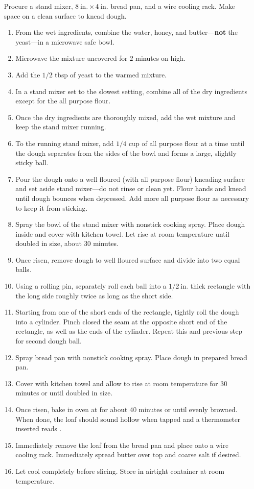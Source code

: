 \documentclass{article}
\begin{document}
\instructions
Procure a stand mixer, $8~\mathrm{in.}\times4~\mathrm{in.}$ bread pan, and a wire cooling rack. Make space on a clean surface to knead dough.
\begin{enumerate}
    \item From the wet ingredients, combine the water, honey, and butter---\textbf{not} the yeast---in a microwave safe bowl.
    \item Microwave the mixture uncovered for $2$ minutes on high.\footnotemark[5]
    \item Add the $1/2$ tbsp of yeast to the warmed mixture.
    \item In a stand mixer set to the slowest setting, combine all of the dry ingredients except for the all purpose flour.
    \item Once the dry ingredients are thoroughly mixed, add the wet mixture and keep the stand mixer running.
    \item To the running stand mixer, add $1/4$ cup of all purpose flour at a time until the dough separates from the sides of the bowl and forms a large, slightly sticky ball.
    \item Pour the dough onto a well floured (with all purpose flour) kneading surface and set aside stand mixer---do not rinse or clean yet. Flour hands and knead until dough bounces when depressed. Add more all purpose flour as necessary to keep it from sticking.
    \item Spray the bowl of the stand mixer with nonstick cooking spray. Place dough inside and cover with kitchen towel. Let rise at room temperature until doubled in size, about $30$ minutes.
    \item Once risen, remove dough to well floured surface and divide into two equal balls.
    \item Using a rolling pin, separately roll each ball into a $1/2~\mathrm{in.}$ thick rectangle with the long side roughly twice as long as the short side.
    \item Starting from one of the short ends of the rectangle, tightly roll the dough into a cylinder. Pinch closed the seam at the opposite short end of the rectangle, as well as the ends of the cylinder. Repeat this and previous step for second dough ball.\footnotemark[6]
    \item Spray bread pan with nonstick cooking spray. Place dough in prepared bread pan.
    \item Cover with kitchen towel and allow to rise at room temperature for $30$ minutes or until doubled in size.
    \item Once risen, bake in oven at  for about $40$ minutes or until evenly browned. When done, the loaf should sound hollow when tapped and a thermometer inserted reads .
    \item Immediately remove the loaf from the bread pan and place onto a wire cooling rack. Immediately spread butter over top and coarse salt if desired.
    \item Let cool completely before slicing. Store in airtight container at room temperature.
\end{enumerate}
\end{document}
